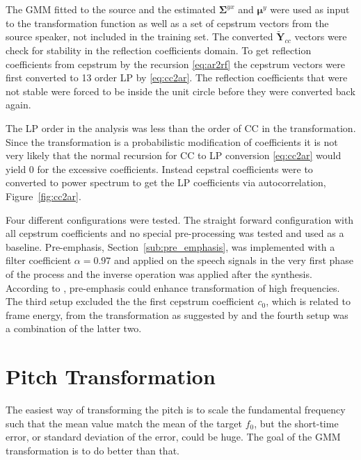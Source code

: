The GMM fitted to the source and the estimated $\mathbf{\Sigma}^{yx}$ and $\boldsymbol{\mu}^y$ were used as input to the transformation function as well as a set of cepstrum vectors from the source speaker, not included in the training set. The converted $\mathbf{\tilde{Y}}_{cc}$ vectors were check for stability in the reflection coefficients domain. To get reflection coefficients from cepstrum by the recursion \eqref{eq:ar2rf} the cepstrum vectors were first converted to 13 order LP by \eqref{eq:cc2ar}. The reflection coefficients that were not stable were forced to be inside the unit circle before they were converted back again. 

The LP order in the analysis was less than the order of CC in the transformation. Since the transformation is a probabilistic modification of coefficients it is not very likely that the normal recursion for CC to LP conversion \eqref{eq:cc2ar} would yield 0 for the excessive coefficients. Instead cepstral coefficients were to converted to power spectrum to get the LP coefficients via autocorrelation, Figure~\ref{fig:cc2ar}.

Four different configurations were tested. The straight forward configuration with all cepstrum coefficients and no special pre-processing was tested and used as a baseline. Pre-emphasis, Section~\ref{sub:pre_emphasis}, was implemented with a filter coefficient $\alpha=0.97$ and applied on the speech signals in the very first phase of the process and the inverse operation was applied after the synthesis. According to \cite{turk06}, pre-emphasis could enhance transformation of high frequencies. The third setup excluded the the first cepstrum coefficient $c_0$, which is related to frame energy, from the transformation as suggested by \cite{stylianou98} and the fourth setup was a combination of the latter two.


\section{Pitch Transformation} %
\label{sec:pitch_transformation}
The easiest way of transforming the pitch is to scale the fundamental frequency such that the mean value match the mean of the target $f_0$, but the short-time error, or standard deviation of the error, could be huge. The goal of the GMM transformation is to do better than that.

